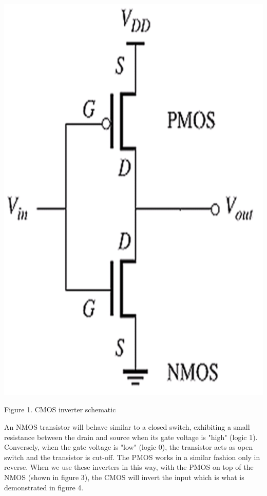 \documentclass[conference]{IEEEtran}
\begin{document}
    \begin{center}
        \centerline{\includegraphics[scale = 0.4]{figures/CMOS_schematic.png}}
        Figure 1. CMOS inverter schematic
    \end{center}

    An NMOS transistor will behave similar to a closed switch, exhibiting a small 
    resistance between the drain and source when its gate voltage is "high" (logic 1). 
    Conversely, when the gate voltage is "low" (logic 0), the transistor acts as open 
    switch and the transistor is cut-off. The PMOS works in a similar fashion only in 
    reverse. When we use these inverters in this way, with the PMOS on top of the NMOS 
    (shown in figure 3), the CMOS will invert the input which is what is demonstrated in 
    figure 4.
\end{document}
